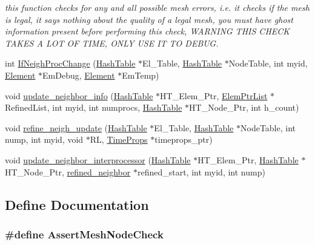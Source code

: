 \begin{CompactItemize}
\begin{CompactList}\small\item\em this function checks for any and all possible mesh errors, i.e. it checks if the mesh is legal, it says nothing about the quality of a legal mesh, you must have ghost information present before performing this check, WARNING THIS CHECK TAKES A LOT OF TIME, ONLY USE IT TO DEBUG. \item\end{CompactList}\item 
int \hyperlink{updatenei_8C_a8}{If\-Neigh\-Proc\-Change} (\hyperlink{classHashTable}{Hash\-Table} $\ast$El\_\-Table, \hyperlink{classHashTable}{Hash\-Table} $\ast$Node\-Table, int myid, \hyperlink{classElement}{Element} $\ast$Em\-Debug, \hyperlink{classElement}{Element} $\ast$Em\-Temp)
\item 
void \hyperlink{updatenei_8C_a9}{update\_\-neighbor\_\-info} (\hyperlink{classHashTable}{Hash\-Table} $\ast$HT\_\-Elem\_\-Ptr, \hyperlink{classElemPtrList}{Elem\-Ptr\-List} $\ast$Refined\-List, int myid, int numprocs, \hyperlink{classHashTable}{Hash\-Table} $\ast$HT\_\-Node\_\-Ptr, int h\_\-count)
\item 
void \hyperlink{updatenei_8C_a10}{refine\_\-neigh\_\-update} (\hyperlink{classHashTable}{Hash\-Table} $\ast$El\_\-Table, \hyperlink{classHashTable}{Hash\-Table} $\ast$Node\-Table, int nump, int myid, void $\ast$RL, \hyperlink{structTimeProps}{Time\-Props} $\ast$timeprops\_\-ptr)
\item 
void \hyperlink{updatenei_8C_a11}{update\_\-neighbor\_\-interprocessor} (\hyperlink{classHashTable}{Hash\-Table} $\ast$HT\_\-Elem\_\-Ptr, \hyperlink{classHashTable}{Hash\-Table} $\ast$HT\_\-Node\_\-Ptr, \hyperlink{structrefined__neighbor}{refined\_\-neighbor} $\ast$refined\_\-start, int myid, int nump)
\end{CompactItemize}


\subsection{Define Documentation}
\hypertarget{updatenei_8C_a1}{
\subsubsection[AssertMeshNodeCheck]{\setlength{\rightskip}{0pt plus 5cm}\#define Assert\-Mesh\-Node\-Check}}
\label{updatenei_8C_a1}



